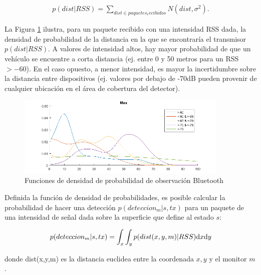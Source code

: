 \begin{align}\label{eq:dist_given_rss}
 p(dist|RSS)= \sum_{dist \in paquetes_recibidos}{N(dist,\sigma^2).}
\end{align}

La Figura \ref{fig:opdf-kernel} ilustra, para un paquete recibido con una intensidad RSS dada, la densidad de probabilidad de la distancia en la que se encontraría el transmisor $p(dist|RSS)$. A valores de intensidad altos, hay mayor probabilidad de que un vehículo se encuentre a corta distancia (ej. entre 0 y 50 metros para un RSS $>-60$). En el caso opuesto, a menor intensidad, es mayor la incertidumbre sobre la distancia entre dispositivos (ej. valores por debajo de -70dB pueden provenir de cualquier ubicación en el área de cobertura del detector).

\begin{figure}[!htp]
	\centering
	\includegraphics[width=0.9\textwidth]{images/selected-opdf.png}
	\caption{Funciones de densidad de probabilidad de observación Bluetooth}
    \label{fig:opdf-kernel}
\end{figure}

Definida la función de densidad de probabilidades, es posible calcular la probabilidad de hacer una detección $p(deteccion_m|s,tx)$ para un paquete de una intensidad de señal dada sobre la superficie que define al estado $s$:

\begin{align}
    \centering
    p(deteccion_m|s,tx) = \int_x \int_y p(dist(x,y,m)|RSS)\mathrm{d}x\mathrm{d}y
\end{align}

donde dist(x,y,m) es la distancia euclidea entre la coordenada $x,y$ y el monitor $m$.